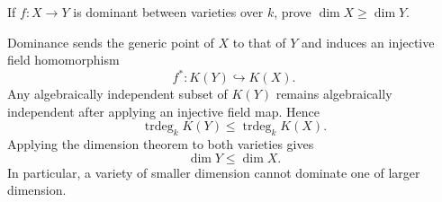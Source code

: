 \begin{problem}\label{prob:vi30-13}
If \(f:X\to Y\) is dominant between varieties over \(k\), prove \(\dim X\geq\dim Y\).

\end{problem}

\ifdefined\FullProblemDossiers
\begin{solution}
Dominance sends the generic point of \(X\) to that of \(Y\) and induces an injective field homomorphism
\[
f^*:K(Y)\hookrightarrow K(X).
\]
Any algebraically independent subset of \(K(Y)\) remains algebraically independent after applying an injective
field map. Hence
\[
\operatorname{trdeg}_kK(Y)
\le
\operatorname{trdeg}_kK(X).
\]
Applying the dimension theorem to both varieties gives
\[
\boxed{\dim Y\le\dim X}.
\]
In particular, a variety of smaller dimension cannot dominate one of larger dimension.
\end{solution}
\fi

